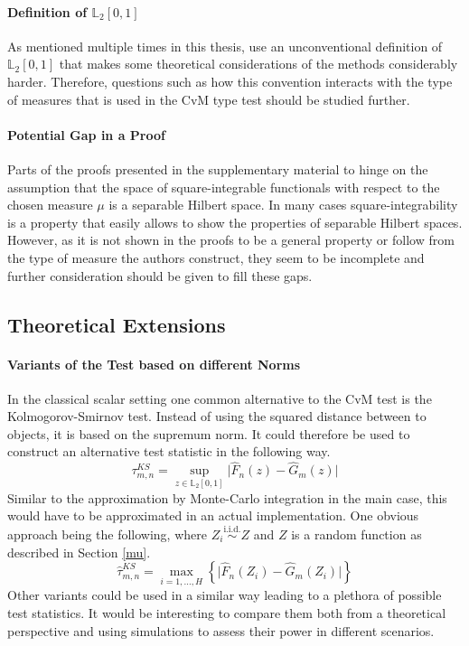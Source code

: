 \documentclass[12pt, a4paper]{article}
\theoremstyle{MAstyle} \newtheorem{assumption}{Assumption}[section]
\theoremstyle{MAstyle} \newtheorem{definition}{Definition}[section]
\theoremstyle{MAstyle} \newtheorem{theorem}{Theorem}[section]
\begin{document}
			\paragraph{Definition of $\mathbb{L}_2[0,1]$ \\}
				As mentioned multiple times in this thesis, \cite{bugni_permutation_2021} use an unconventional definition of $\mathbb{L}_2[0,1]$ that makes some theoretical considerations of the methods considerably harder. Therefore, questions such as how this convention interacts with the type of measures that is used in the CvM type test should be studied further. 
				
			\paragraph{Potential Gap in a Proof\\}
				Parts of the proofs presented in the supplementary material to \cite{bugni_permutation_2021} hinge on the assumption that the space of square-integrable functionals with respect to the chosen measure $\mu$ is a separable Hilbert space. In many cases square-integrability is a property that easily allows to show the properties of separable Hilbert spaces. However, as it is not shown in the proofs to be a general property or follow from the type of measure the authors construct, they seem to be incomplete and further consideration should be given to fill these gaps.
	
		\subsection{Theoretical Extensions}
			\paragraph{Variants of the Test based on different Norms\\}
			In the classical scalar setting one common alternative to the CvM test is the Kolmogorov-Smirnov test. Instead of using the squared distance between to objects, it is based on the supremum norm. It could therefore be used to construct an alternative test statistic in the following way. 
			\begin{equation}
				\tau^{\textit{KS}}_{m,n} = \sup_{z \in \mathbb{L}_2[0,1]} \vert \hat{F}_n(z) - \hat{G}_m(z) \vert
			\end{equation}
			Similar to the approximation by Monte-Carlo integration in the main case, this would have to be approximated in an actual implementation. One obvious approach being the following, where $Z_i \stackrel{\text{i.i.d.}}{\sim} Z$ and $Z$ is a random function as described in Section \ref{mu}.
			\begin{equation}
				\hat{\tau}^{\textit{KS}}_{m,n} = \max_{i = 1, \dots, H}\left\{\vert \hat{F}_n(Z_i) - \hat{G}_m(Z_i) \vert \right\}
			\end{equation}
			Other variants could be used in a similar way leading to a plethora of possible test statistics. It would be interesting to compare them both from a theoretical perspective and using simulations to assess their power in different scenarios.
		
\end{document}

